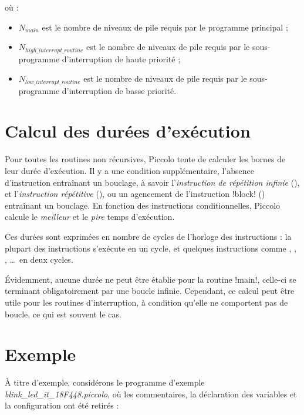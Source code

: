 où :
\begin{itemize}
\item $N_{main}$ est le nombre de niveaux de pile requis par le programme principal ;
\item $N_{high\_interrupt\_routine}$ est le nombre de niveaux de pile requis par le sous-programme d'interruption de haute priorité ;
\item $N_{low\_interrupt\_routine}$ est le nombre de niveaux de pile requis par le sous-programme d'interruption de basse priorité.
\end{itemize}


\section{Calcul des durées d'exécution}

Pour toutes les routines non récursives, Piccolo tente de calculer les bornes de leur durée d'exécution. Il y a une condition supplémentaire, l'absence d'instruction entraînant un bouclage, à savoir l'\emph{instruction de répétition infinie} (), et l'\emph{instruction répétitive} (), ou un agencement de l'instruction \pic!block! () entraînant un bouclage. En fonction des instructions conditionnelles, Piccolo calcule le \emph{meilleur} et le \emph{pire} temps d'exécution.

Ces durées sont exprimées en nombre de cycles de l'horloge des instructions : la plupart des instructions s'exécute en un cycle, et quelques instructions comme , , , \dots\ en deux cycles.

Évidemment, aucune durée ne peut être établie pour la routine \pic!main!, celle-ci se terminant obligatoirement par une boucle infinie. Cependant, ce calcul peut être utile pour les routines d'interruption, à condition qu'elle ne comportent pas de boucle, ce qui est souvent le cas.

\section{Exemple}

À titre d'exemple, considérons le programme d'exemple \emph{blink\_led\_it\_18F448.piccolo}, où les commentaires, la déclaration des variables et la configuration ont été retirés :

